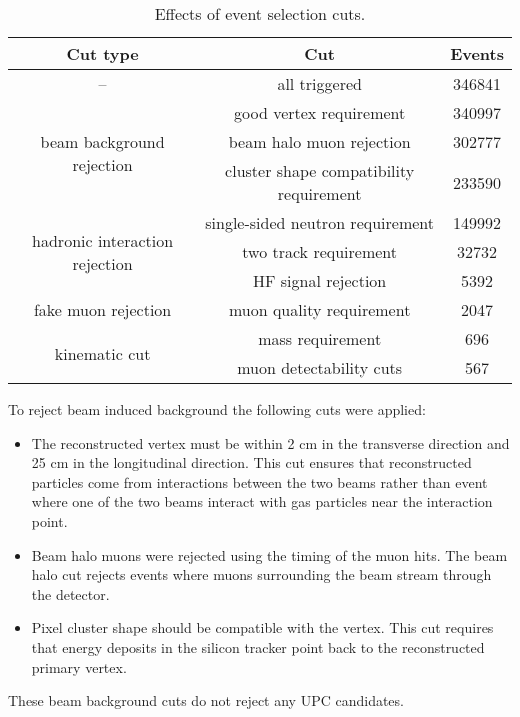       \begin{table}
        \centering
        \begin{tabular}{|c|c|c|} \hline 
          Cut type & Cut & Events \\ \hline
          -- & all triggered & 346841 \\ \hline
          \multirow{3}{*}{beam background rejection} & good vertex requirement & 340997 \\ \hhline{~--}
          & beam halo muon rejection & 302777 \\ \hhline{~--}
          & cluster shape compatibility requirement & 233590 \\ \hline
          \multirow{3}{*}{hadronic interaction rejection} & single-sided neutron requirement & 149992 \\ \hhline{~--}
          & two track requirement & 32732 \\ \hhline{~--}
          & HF signal rejection & 5392 \\ \hline
          fake muon rejection & muon quality requirement & 2047 \\ \hline
          \multirow{2}{*}{kinematic cut} & \JPsi{} mass requirement & 696 \\ \hhline{~--}
          & muon detectability cuts & 567 \\ \hline
        \end{tabular}
        \caption{Effects of event selection cuts.}
        \label{tab:evSelCutNumbers}
      \end{table}
      
      To reject beam induced background the following cuts were applied:
      \begin{itemize}
        \item The reconstructed vertex must be within 2 cm in 
          the transverse direction and 25 cm in the 
          longitudinal direction. This cut ensures that reconstructed particles 
          come from interactions between the two beams rather than event where 
          one of the two beams interact with gas particles near the interaction 
          point. 
  	    \item Beam halo muons were rejected using the timing of the muon hits.
          The beam halo cut rejects events where muons surrounding the beam 
          stream through the detector. 
  	    \item Pixel cluster shape should be compatible with the vertex. 
          This cut requires that energy deposits in the silicon tracker point 
            back to the reconstructed  primary vertex. 
      \end{itemize}
      These beam background cuts do not reject any UPC \JPsi{} candidates. 
  
